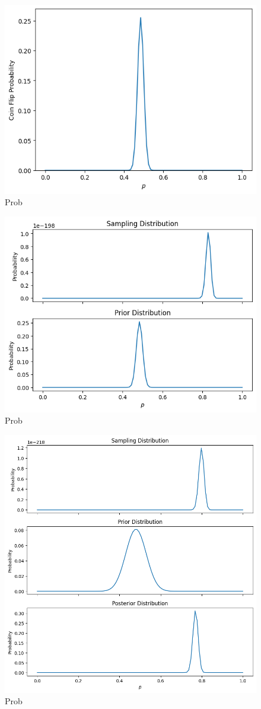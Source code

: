 \begin{figure}[h]
  \begin{center}
    \includegraphics[width=0.6\linewidth]{figures/bayes_p2}
  \end{center}
  \caption{Prob}
  \label{fig:bayes_p2}
\end{figure}

\begin{figure}[h]
  \begin{center}
    \includegraphics[width=0.6\linewidth]{figures/bayes_p3}
  \end{center}
  \caption{Prob}
  \label{fig:bayes_p3}
\end{figure}

\begin{figure}[h]
  \begin{center}
    \includegraphics[width=0.6\linewidth]{figures/bayes_p5}
  \end{center}
  \caption{Prob}
  \label{fig:bayes_p5}
\end{figure}

